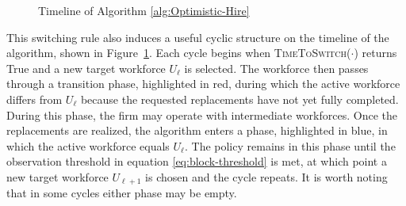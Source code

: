 \documentclass[opre,blindrev]{informs3}
\newcommand{\TimeToSwitch}{\textsc{TimeToSwitch}}
\begin{document}
\begin{figure}[H]
    \centering
    \caption{Timeline of Algorithm \ref{alg:Optimistic-Hire}}
    \label{fig:intro-timeline}
\end{figure}

\vspace{-.2in}

This switching rule also induces a useful cyclic structure on the timeline of the algorithm, shown in Figure~\ref{fig:intro-timeline}. Each cycle begins when \TimeToSwitch(\(\cdot\)) returns True and a new target workforce \(U_\ell\) is selected. The workforce then passes through a transition phase, highlighted in red, during which the active workforce differs from \(U_\ell\) because the requested replacements have not yet fully completed. During this phase, the firm may operate with intermediate workforces. Once the replacements are realized, the algorithm enters a phase, highlighted in blue, in which the active workforce equals \(U_\ell\). The policy remains in this phase until the observation threshold in equation \eqref{eq:block-threshold} is met, at which point a new target workforce \(U_{\ell+1}\) is chosen and the cycle repeats. It is worth noting that in some cycles either phase may be empty. 
\end{document}
